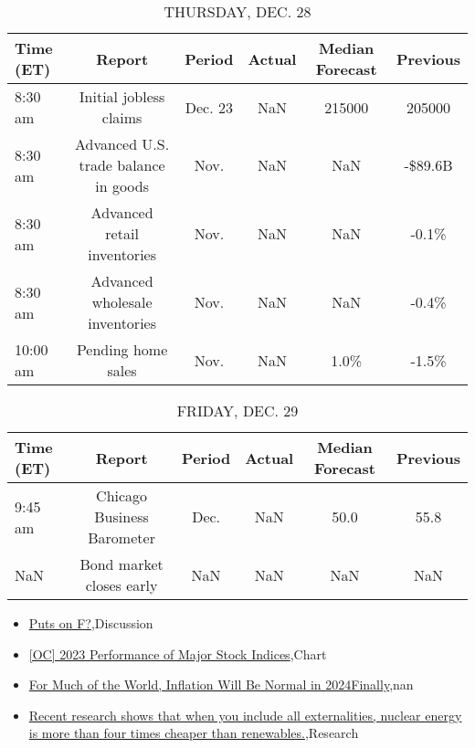 \documentclass{article}%
\begin{document}
\begin{table}[htbp]%
\caption{THURSDAY, DEC. 28}%
\centering%
\begin{adjustbox}{width=1\textwidth}%
\begin{tabular}{lccccc}
\toprule
Time (ET) &                               Report &  Period & Actual & Median Forecast & Previous \\
\midrule
  8:30 am &               Initial jobless claims & Dec. 23 &    NaN &          215000 &   205000 \\
  8:30 am & Advanced U.S. trade balance in goods &    Nov. &    NaN &             NaN &  -\$89.6B \\
  8:30 am &          Advanced retail inventories &    Nov. &    NaN &             NaN &    -0.1\% \\
  8:30 am &       Advanced wholesale inventories &    Nov. &    NaN &             NaN &    -0.4\% \\
 10:00 am &                   Pending home sales &    Nov. &    NaN &            1.0\% &    -1.5\% \\
\bottomrule
\end{tabular}
%
\end{adjustbox}%
\end{table}

%


\begin{table}[htbp]%
\caption{FRIDAY, DEC. 29}%
\centering%
\begin{adjustbox}{width=1\textwidth}%
\begin{tabular}{lccccc}
\toprule
Time (ET) &                     Report & Period & Actual & Median Forecast & Previous \\
\midrule
  9:45 am & Chicago Business Barometer &   Dec. &    NaN &            50.0 &     55.8 \\
      NaN &   Bond market closes early &    NaN &    NaN &             NaN &      NaN \\
\bottomrule
\end{tabular}
%
\end{adjustbox}%
\end{table}

%
\begin{itemize}%
\item%
\href{https://reddit.com/r/wallstreetbets/comments/18r6lnv/puts\_on\_f/}{Puts on F?},Discussion%
\item%
\href{https://reddit.com/r/wallstreetbets/comments/18r3ql4/oc\_2023\_performance\_of\_major\_stock\_indices/}{[OC] 2023 Performance of Major Stock Indices},Chart%
\item%
\href{https://reddit.com/r/Economics/comments/18qpb7l/for\_much\_of\_the\_world\_inflation\_will\_be\_normal\_in/}{For Much of the World, Inflation Will Be Normal in 2024Finally},nan%
\item%
\href{https://reddit.com/r/Economics/comments/18qk507/recent\_research\_shows\_that\_when\_you\_include\_all/}{Recent research shows that when you include all externalities, nuclear energy is more than four times cheaper than renewables.},Research%
\end{itemize}%
\end{document}
